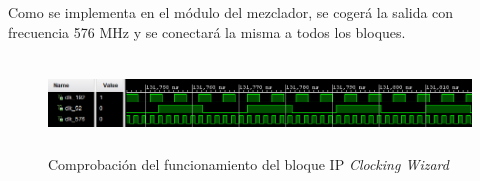 Como se implementa en el módulo del mezclador, se cogerá la salida con frecuencia 576 MHz y se conectará la misma a todos los bloques.

\vspace{3mm}

\begin{figure}[h]
	\centering
	\includegraphics[width=1\textwidth, height=2.5cm]{img/simu/mmcm.PNG}
	\caption{Comprobación del funcionamiento del bloque IP \textit{Clocking Wizard}}
	\label{fig:mmcm2}
\end{figure}



